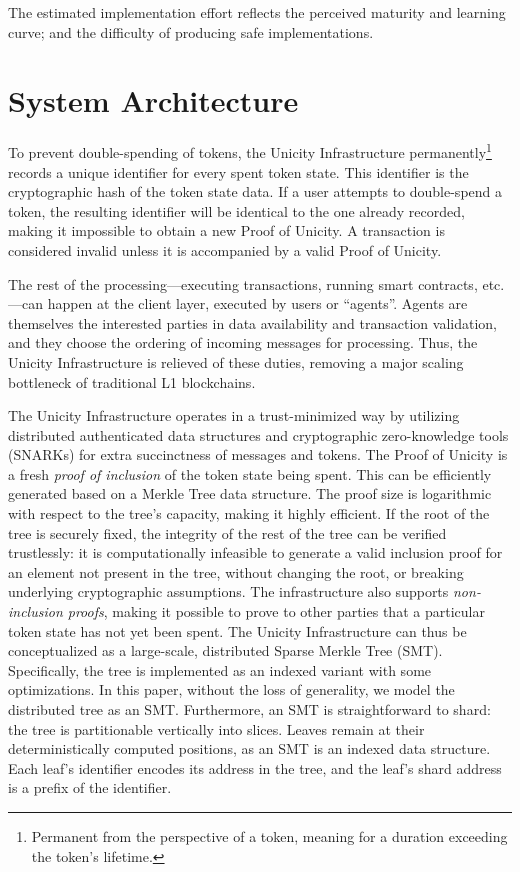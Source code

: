 \documentclass[twocolumn]{article}
\begin{document}
The estimated implementation effort reflects the perceived maturity and learning curve; and the difficulty of producing safe implementations.





\section{System Architecture}

To prevent double-spending of tokens, the Unicity Infrastructure permanently\footnote{Permanent from the perspective of a token, meaning for a duration exceeding the token's lifetime.} records a unique identifier for every spent token state. This identifier is the cryptographic hash of the token state data. If a user attempts to double-spend a token, the resulting identifier will be identical to the one already recorded, making it impossible to obtain a new Proof of Unicity. A transaction is considered invalid unless it is accompanied by a valid Proof of Unicity.

The rest of the processing---executing transactions, running smart contracts, etc.---can happen at the client layer, executed by users or ``agents''. Agents are themselves the interested parties in data availability and transaction validation, and they choose the ordering of incoming messages for processing. Thus, the Unicity Infrastructure is relieved of these duties, removing a major scaling bottleneck of traditional L1 blockchains.

The Unicity Infrastructure operates in a trust-minimized way by utilizing distributed authenticated data structures and cryptographic zero-knowledge tools (SNARKs) for extra succinctness of messages and tokens. The Proof of Unicity is a fresh \emph{proof of inclusion} of the token state being spent. This can be efficiently generated based on a Merkle Tree data structure. The proof size is logarithmic with respect to the tree's capacity, making it highly efficient. If the root of the tree is securely fixed, the integrity of the rest of the tree can be verified trustlessly: it is computationally infeasible to generate a valid inclusion proof for an element not present in the tree, without changing the root, or breaking underlying cryptographic assumptions. The infrastructure also supports \textit{non-inclusion proofs}, making it possible to prove to other parties that a particular token state has not yet been spent. The Unicity Infrastructure can thus be conceptualized as a large-scale, distributed Sparse Merkle Tree (SMT). Specifically, the tree is implemented as an indexed variant with some optimizations. In this paper, without the loss of generality, we model the distributed tree as an SMT. Furthermore, an SMT is straightforward to shard: the tree is partitionable vertically into slices. Leaves remain at their deterministically computed positions, as an SMT is an indexed data structure. Each leaf's identifier encodes its address in the tree, and the leaf's shard address is a prefix of the identifier.
\end{document}
